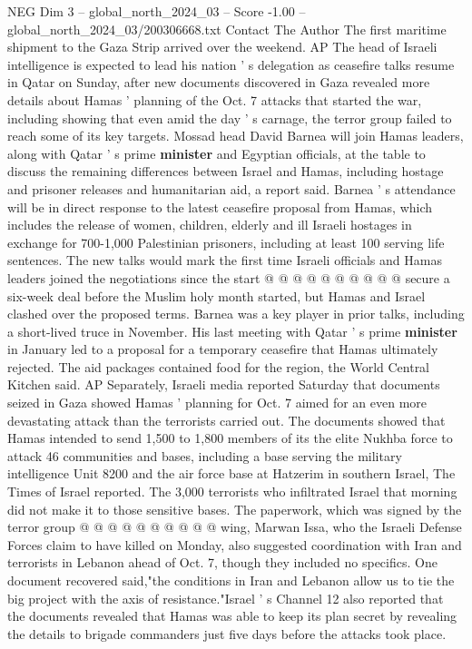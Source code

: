 \begin{textsample}{NEG Dim 3 – global\_north\_2024\_03 – Score -1.00 – global\_north\_2024\_03/200306668.txt}  \label{ex:f3_neg_190}
Contact The Author The first maritime shipment to the Gaza Strip arrived over the weekend.
AP The head of Israeli intelligence is expected to lead his nation ' s delegation as ceasefire talks resume in Qatar on Sunday, after new documents discovered in Gaza revealed more details about Hamas ' planning of the Oct. 7 attacks that started the war, including showing that even amid the day ' s carnage, the terror group failed to reach some of its key targets.
Mossad head David Barnea will join Hamas leaders, along with Qatar ' s prime \textbf{minister} and Egyptian officials, at the table to discuss the remaining differences between Israel and Hamas, including hostage and prisoner releases and humanitarian aid, a report said.
Barnea ' s attendance will be in direct response to the latest ceasefire proposal from Hamas, which includes the release of women, children, elderly and ill Israeli hostages in exchange for 700-1,000 Palestinian prisoners, including at least 100 serving life sentences.
The new talks would mark the first time Israeli officials and Hamas leaders joined the negotiations since the start @ @ @ @ @ @ @ @ @ @ secure a six-week deal before the Muslim holy month started, but Hamas and Israel clashed over the proposed terms.
Barnea was a key player in prior talks, including a short-lived truce in November.
His last meeting with Qatar ' s prime \textbf{minister} in January led to a proposal for a temporary ceasefire that Hamas ultimately rejected.
The aid packages contained food for the region, the World Central Kitchen said.
AP Separately, Israeli media reported Saturday that documents seized in Gaza showed Hamas ' planning for Oct. 7 aimed for an even more devastating attack than the terrorists carried out.
The documents showed that Hamas intended to send 1,500 to 1,800 members of its the elite Nukhba force to attack 46 communities and bases, including a base serving the military intelligence Unit 8200 and the air force base at Hatzerim in southern Israel, The Times of Israel reported.
The 3,000 terrorists who infiltrated Israel that morning did not make it to those sensitive bases.
The paperwork, which was signed by the terror group @ @ @ @ @ @ @ @ @ @ wing, Marwan Issa, who the Israeli Defense Forces claim to have killed on Monday, also suggested coordination with Iran and terrorists in Lebanon ahead of Oct. 7, though they included no specifics.
One document recovered said,"the conditions in Iran and Lebanon allow us to tie the big project with the axis of resistance."Israel ' s Channel 12 also reported that the documents revealed that Hamas was able to keep its plan secret by revealing the details to brigade commanders just five days before the attacks took place.

\end{textsample}
